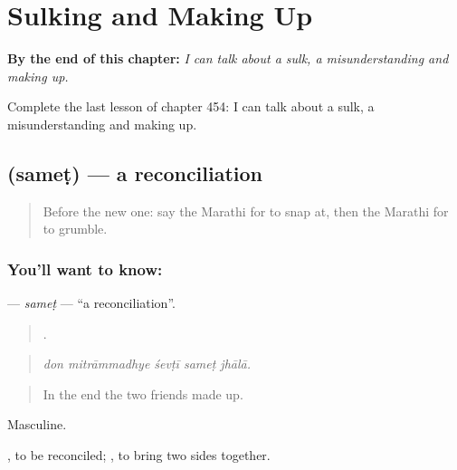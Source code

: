 
\chapter{Sulking and Making Up}
\label{ch:mr-sulking-and-making-up}

\begin{chapteropening}
\textbf{By the end of this chapter:} \emph{I can talk about a sulk, a misunderstanding and making up.}

Complete the last lesson of chapter 454: I can talk about a sulk, a misunderstanding and making up.
\end{chapteropening}

\section[\texorpdfstring{\mr{समेट} (sameṭ)}{समेट (sameṭ)}]{ (sameṭ) — a reconciliation}

\label{lesson:MR-C454-samet}



\begin{quote}
Before the new one: say the Marathi for to snap at, then the Marathi for to grumble.
\end{quote}

\subsection*{You'll want to know: }
\textbf{} — \emph{sameṭ} — \textquotedblleft{}a reconciliation\textquotedblright{}.

\begin{quote}
    .
\end{quote}

\begin{quote}
\emph{don mitrāmmadhye śevṭī sameṭ jhālā.}
\end{quote}

\begin{quote}
In the end the two friends made up.
\end{quote}

Masculine.

 , to be reconciled;  , to bring two sides together.

